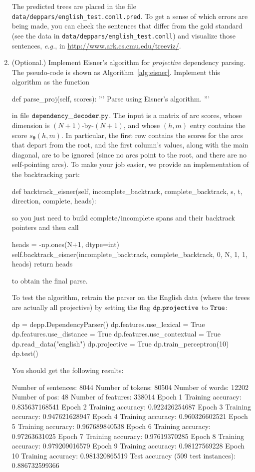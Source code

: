 \begin{exercise}
\begin{enumerate}
The predicted trees are placed in the file {\tt data/deppars/english\_test.conll.pred}. 
To get a sense of which errors are being made, you can 
check the sentences that differ from the gold standard (see the data in {\tt data/deppars/english\_test.conll}) 
and visualize those sentences, \emph{e.g.}, in 
\url{http://www.ark.cs.cmu.edu/treeviz/}. 

\item (Optional.) Implement Eisner's algorithm for \emph{projective} dependency parsing. 
The pseudo-code is shown as Algorithm~\ref{alg:eisner}. Implement this algorithm as the function

\begin{python}
    def parse_proj(self, scores):
        '''
        Parse using Eisner's algorithm.
        '''
\end{python}
in file ${\tt{dependency\_decoder.py}}$. The input is a matrix of arc scores, whose dimension is 
$(N+1)$-by-$(N+1)$, and whose $(h,m)$ entry contains the score $s_{\boldsymbol{\theta}}(h,m)$. 
In particular, the first row contains the scores for the arcs that depart from the root, 
and the first column's values, along with the main diagonal, are to be ignored (since no arcs 
point to the root, and there are no self-pointing arcs).
To make your job easier, we provide an implementation of the backtracking part:
\begin{python}
    def backtrack_eisner(self, incomplete_backtrack, complete_backtrack, s, t, direction, complete, heads):
\end{python}
so you just need to build complete/incomplete spans and their backtrack pointers and then call
\begin{python}
    heads = -np.ones(N+1, dtype=int)
    self.backtrack_eisner(incomplete_backtrack, complete_backtrack, 0, N, 1, 1, heads)
    return heads
\end{python}
to obtain the final parse.

To test the algorithm, retrain the parser on the English data (where the trees are actually all
projective) by setting the flag ${\tt{dp.projective}}$ to ${\tt{True}}$:
\begin{python}
dp = depp.DependencyParser()
dp.features.use_lexical = True
dp.features.use_distance = True
dp.features.use_contextual = True
dp.read_data("english")
dp.projective = True
dp.train_perceptron(10)
dp.test()
\end{python}

You should get the following results:
\begin{python}
Number of sentences: 8044
Number of tokens: 80504
Number of words: 12202
Number of pos: 48
Number of features: 338014
Epoch 1
Training accuracy: 0.835637168541
Epoch 2
Training accuracy: 0.922426254687
Epoch 3
Training accuracy: 0.947621628947
Epoch 4
Training accuracy: 0.960326602521
Epoch 5
Training accuracy: 0.967689840538
Epoch 6
Training accuracy: 0.97263631025
Epoch 7
Training accuracy: 0.97619370285
Epoch 8
Training accuracy: 0.979209016579
Epoch 9
Training accuracy: 0.98127569228
Epoch 10
Training accuracy: 0.981320865519
Test accuracy (509 test instances): 0.886732599366
\end{python}


\end{enumerate}
\end{exercise}

